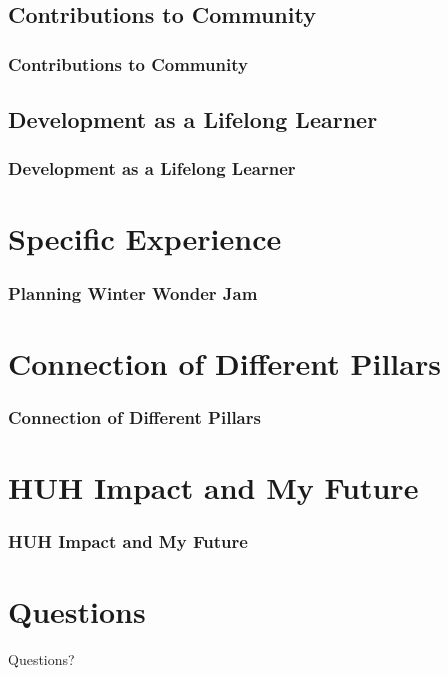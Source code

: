 \documentclass{beamer}
\begin{document}

\subsection{Contributions to Community}

\begin{frame}
\frametitle{Contributions to Community}

\end{frame}


\subsection{Development as a Lifelong Learner}

\begin{frame}
\frametitle{Development as a Lifelong Learner}

\end{frame}

\section{Specific Experience}

\begin{frame}
\frametitle{Planning Winter Wonder Jam}

\end{frame}


\section{Connection of Different Pillars}

\begin{frame}
\frametitle{Connection of Different Pillars}

\end{frame}


\section{HUH Impact and My Future}

\begin{frame}
\frametitle{HUH Impact and My Future}

\end{frame}


\section{Questions}

\begin{frame}
\Huge{\centerline{Questions?}}
\end{frame}

\end{document}
